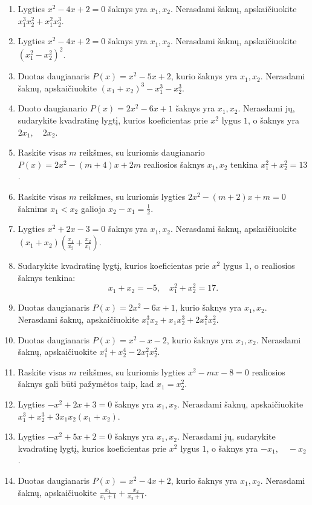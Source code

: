 \documentclass[11pt,a4paper]{article}
\begin{document}
\begin{enumerate}
\item Lygties \(x^2-4x+2=0\) šaknys yra \(x_1,x_2\). Nerasdami šaknų, apskaičiuokite \mbox{\(x_1^3x_2^2+x_1^2x_2^3\)}.
\item Lygties \(x^2-4x+2=0\) šaknys yra \(x_1,x_2\). Nerasdami šaknų, apskaičiuokite \mbox{\((x_1^2-x_2^2)^2\)}.
\item Duotas daugianaris \(P(x)=x^2-5x+2\), kurio šaknys yra \(x_1,x_2\). Nerasdami šaknų, apskaičiuokite \mbox{\((x_1+x_2)^3-x_1^3-x_2^3\)}.
\item Duoto daugianario \(P(x)=2x^2-6x+1\) šaknys yra \(x_1,x_2\). Nerasdami jų, sudarykite kvadratinę lygtį, kurios koeficientas prie \(x^2\) lygus \(1\), o šaknys yra \mbox{\(2x_1,\quad 2x_2\)}.
\item Raskite visas \(m\) reikšmes, su kuriomis daugianario \(P(x)=2x^2-(m+4)x+2m\) realiosios šaknys \(x_1,x_2\) tenkina \mbox{\(x_1^2+x_2^2=13\)}.
\item Raskite visas \(m\) reikšmes, su kuriomis lygties \(2x^2-(m+2)x+m=0\) šaknims \(x_1<x_2\) galioja \mbox{\(x_2-x_1=\frac{1}{2}\)}.
\item Lygties \(x^2+2x-3=0\) šaknys yra \(x_1,x_2\). Nerasdami šaknų, apskaičiuokite \mbox{\((x_1+x_2)\left(\frac{x_1}{x_2}+\frac{x_2}{x_1}\right)\)}.
\item \begin{minipage}[t]{\linewidth}Sudarykite kvadratinę lygtį, kurios koeficientas prie \(x^2\) lygus \(1\), o realiosios šaknys tenkina: \[x_1+x_2=-5,\quad x_1^2+x_2^2=17.\]\end{minipage}
\item Duotas daugianaris \(P(x)=2x^2-6x+1\), kurio šaknys yra \(x_1,x_2\). Nerasdami šaknų, apskaičiuokite \mbox{\(x_1^3x_2+x_1x_2^3+2x_1^2x_2^2\)}.
\item Duotas daugianaris \(P(x)=x^2-x-2\), kurio šaknys yra \(x_1,x_2\). Nerasdami šaknų, apskaičiuokite \mbox{\(x_1^4+x_2^4-2x_1^2x_2^2\)}.
\item Raskite visas \(m\) reikšmes, su kuriomis lygties \(x^2-mx-8=0\) realiosios šaknys gali būti pažymėtos taip, kad \mbox{\(x_1=x_2^2\)}.
\item Lygties \(-x^2+2x+3=0\) šaknys yra \(x_1,x_2\). Nerasdami šaknų, apskaičiuokite \mbox{\(x_1^3+x_2^3+3x_1x_2(x_1+x_2)\)}.
\item Lygties \(-x^2+5x+2=0\) šaknys yra \(x_1,x_2\). Nerasdami jų, sudarykite kvadratinę lygtį, kurios koeficientas prie \(x^2\) lygus \(1\), o šaknys yra \mbox{\(-x_1,\quad -x_2\)}.
\item Duotas daugianaris \(P(x)=x^2-4x+2\), kurio šaknys yra \(x_1,x_2\). Nerasdami šaknų, apskaičiuokite \mbox{\(\frac{x_1}{x_1+1}+\frac{x_2}{x_2+1}\)}.

\end{enumerate}
\end{document}
